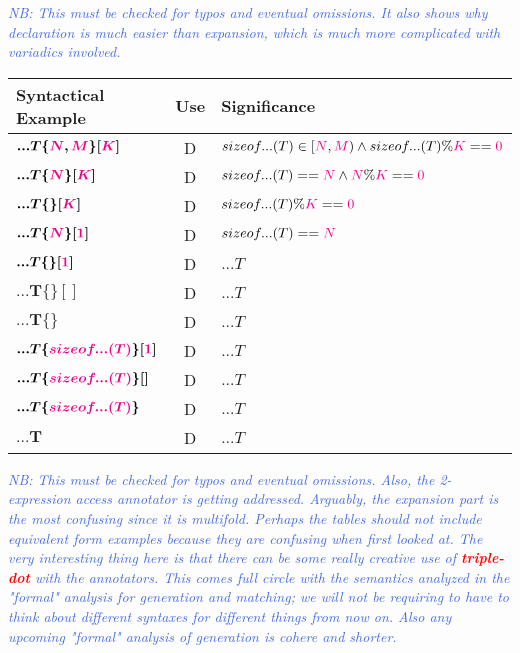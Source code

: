 \textcolor{RoyalBlue}{\textit{NB: This must be checked for typos and eventual omissions.
It also shows why declaration is much easier than expansion, which is much more complicated with variadics involved.}}

\begin{tabularx}{\textwidth}{l|c|X}
  \textbf{Syntactical Example} & \textbf{Use}  &\textbf{Significance} \\
\hline
$\bm{...T\{\textcolor{Magenta}{\textcolor{Magenta}{N}},\textcolor{Magenta}{M}\}[\textcolor{Magenta}{K}]}$ & D & $sizeof...(T) \in [\textcolor{Magenta}{N},\textcolor{Magenta}{M}) \wedge{} sizeof...(T) \% \textcolor{Magenta}{K} == \textcolor{Magenta}{0}$ \\
$\bm{...T\{\textcolor{Magenta}{N}\}[\textcolor{Magenta}{K}]}$ & D & $sizeof...(T) == \textcolor{Magenta}{N} \wedge{} \textcolor{Magenta}{N} \% \textcolor{Magenta}{K} == \textcolor{Magenta}{0}$ \\
$\bm{...T\{\}[\textcolor{Magenta}{K}]}$ & D & $sizeof...(T) \% \textcolor{Magenta}{K} == \textcolor{Magenta}{0}$ \\
$\bm{...T\{\textcolor{Magenta}{N}\}[\textcolor{Magenta}{1}]}$ & D & $sizeof...(T) == \textcolor{Magenta}{N}$ \\
$\bm{...T\{\}[\textcolor{Magenta}{1}]}$ & D & $...T$ \\
$\bm{...T\{\}[]}$ & D & $...T$ \\
$\bm{...T\{\}}$ & D &$...T$ \\
$\bm{...T\{\textcolor{Magenta}{sizeof...(T)}\}[\textcolor{Magenta}{1}]}$ & D & $...T$ \\
$\bm{...T\{\textcolor{Magenta}{sizeof...(T)}\}[]}$ & D &  $...T$ \\
$\bm{...T\{\textcolor{Magenta}{sizeof...(T)}\}}$ & D & $...T$ \\
$\bm{...T}$ & D & $...T$ \\
\end{tabularx}
\newpage
\textcolor{RoyalBlue}{\textit{NB: This must be checked for typos and eventual omissions.
Also, the 2-expression access annotator is getting addressed.
Arguably, the expansion part is the most confusing since it is multifold.
Perhaps the tables should not include equivalent form examples because they are confusing when first looked at.
The very interesting thing here is that there can be some really creative use of \textcolor{Red}{\textbf{\textit{triple-dot}}} with the annotators.
This comes full circle with the semantics analyzed in the "formal" analysis for generation and matching; we will not be requiring to have to think about different syntaxes for different things from now on.
Also any upcoming "formal" analysis of generation is cohere and shorter.}}

